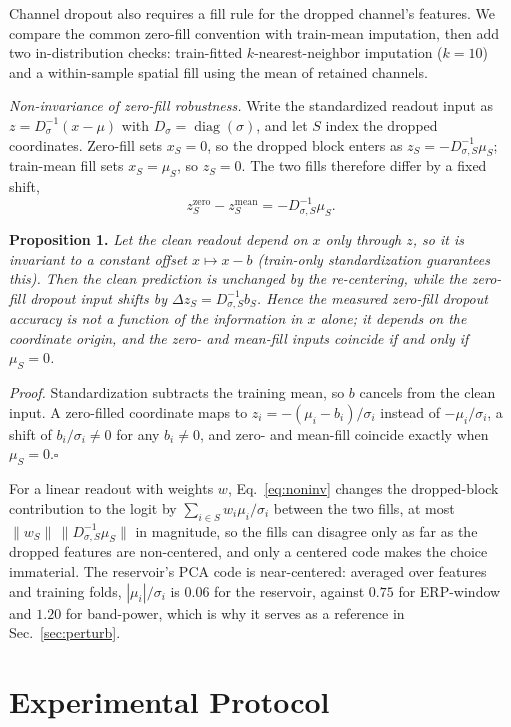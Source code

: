 \documentclass[conference]{IEEEtran}
\begin{document}
Channel dropout also requires a fill rule for the dropped channel's features. We compare the common zero-fill convention with train-mean imputation, then add two in-distribution checks: train-fitted $k$-nearest-neighbor imputation ($k{=}10$) and a within-sample spatial fill using the mean of retained channels.

\emph{Non-invariance of zero-fill robustness.} Write the standardized readout input as $z=D_\sigma^{-1}(x-\mu)$ with $D_\sigma=\operatorname{diag}(\sigma)$, and let $S$ index the dropped coordinates. Zero-fill sets $x_S=0$, so the dropped block enters as $z_S=-D_{\sigma,S}^{-1}\mu_S$; train-mean fill sets $x_S=\mu_S$, so $z_S=0$. The two fills therefore differ by a fixed shift,
\begin{equation}\label{eq:noninv}
z_S^{\mathrm{zero}}-z_S^{\mathrm{mean}}=-D_{\sigma,S}^{-1}\mu_S .
\end{equation}

\noindent\textbf{Proposition 1.} \emph{Let the clean readout depend on $x$ only through $z$, so it is invariant to a constant offset $x\mapsto x-b$ (train-only standardization guarantees this). Then the clean prediction is unchanged by the re-centering, while the zero-fill dropout input shifts by $\Delta z_S=D_{\sigma,S}^{-1}b_S$. Hence the measured zero-fill dropout accuracy is not a function of the information in $x$ alone; it depends on the coordinate origin, and the zero- and mean-fill inputs coincide if and only if $\mu_S=0$.}

\noindent\emph{Proof.} Standardization subtracts the training mean, so $b$ cancels from the clean input. A zero-filled coordinate maps to $z_i=-(\mu_i-b_i)/\sigma_i$ instead of $-\mu_i/\sigma_i$, a shift of $b_i/\sigma_i\neq0$ for any $b_i\neq0$, and zero- and mean-fill coincide exactly when $\mu_S=0$.\hfill$\square$

For a linear readout with weights $w$, Eq.~\eqref{eq:noninv} changes the dropped-block contribution to the logit by $\sum_{i\in S} w_i\mu_i/\sigma_i$ between the two fills, at most $\lVert w_S\rVert\,\lVert D_{\sigma,S}^{-1}\mu_S\rVert$ in magnitude, so the fills can disagree only as far as the dropped features are non-centered, and only a centered code makes the choice immaterial. The reservoir's PCA code is near-centered: averaged over features and training folds, $|\mu_i|/\sigma_i$ is $0.06$ for the reservoir, against $0.75$ for ERP-window and $1.20$ for band-power, which is why it serves as a reference in Sec.~\ref{sec:perturb}.

\section{Experimental Protocol}
\end{document}
